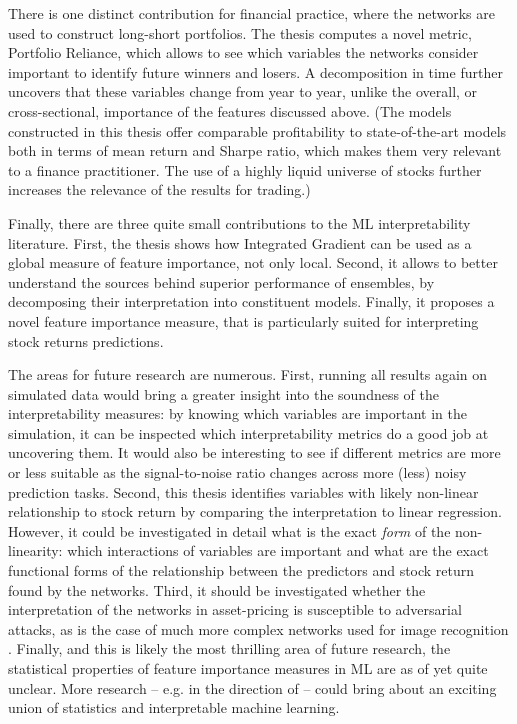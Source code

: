 There is one distinct contribution for financial practice, where the networks are used to construct long-short portfolios. The thesis computes a novel metric, Portfolio Reliance, which allows to see which variables the networks consider important to identify future winners and losers. A decomposition in time further uncovers that these variables change from year to year, unlike the overall, or cross-sectional, importance of the features discussed above. (The models constructed in this thesis offer comparable profitability to state-of-the-art models both in terms of mean return and Sharpe ratio, which makes them very relevant to a finance practitioner. The use of a highly liquid universe of stocks further increases the relevance of the results for trading.)   

Finally, there are three quite small contributions to the ML interpretability literature. First, the thesis shows how Integrated Gradient can be used as a global measure of feature importance, not only local. Second, it allows to better understand the sources behind superior performance of ensembles, by decomposing their interpretation into constituent models. Finally, it proposes a novel feature importance measure, that is particularly suited for interpreting stock returns predictions. 

The areas for future research are numerous. First, running all results again on simulated data would bring a greater insight into the soundness of the interpretability measures: by knowing which variables are important in the simulation, it can be inspected which interpretability metrics do a good job at uncovering them. It would also be interesting to see if different metrics are more or less suitable as the signal-to-noise ratio changes across more (less) noisy prediction tasks. Second, this thesis identifies variables with likely non-linear relationship to stock return by comparing the interpretation to linear regression. However, it could be investigated in detail what is the exact \textit{form} of the non-linearity: which interactions of variables are important and what are the exact functional forms of the relationship between the predictors and stock return found by the networks. Third, it should be investigated whether the interpretation of the networks in asset-pricing is susceptible to adversarial attacks, as is the case of much more complex networks used for image recognition \citep{ghorbani2019interpretation}. Finally, and this is likely the most thrilling area of future research, the statistical properties of feature importance measures in ML are as of yet quite unclear. More research -- e.g. in the direction of \cite{fisher2019all} -- could bring about an exciting union of statistics and interpretable machine learning.   



